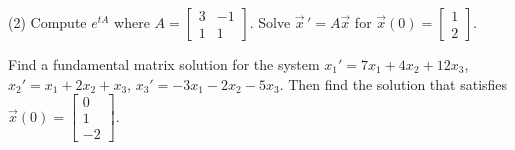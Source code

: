 \documentclass{ximera}
\begin{document}
\begin{exercise}%
    \begin{tasks}(2)
        \task Compute $e^{tA}$ where
        $A=\left[ \begin{smallmatrix}
            3 & -1 \\
            1 & 1 
        \end{smallmatrix}\right]$.
        \task Solve $\vec{x}\,' = A \vec{x}$ for $\vec{x}(0) =
        \left[ \begin{smallmatrix}
            1 \\ 
            2
        \end{smallmatrix}\right]$.
    \end{tasks}
\end{exercise}

\begin{exercise}
    Find a fundamental matrix solution for the system $x_1' = 7x_1+4x_2+ 12x_3$, $x_2' = x_1+2x_2+x_3$, $x_3' = -3x_1-2x_2- 5x_3$.  Then find the solution that satisfies $\vec{x}(0) = 
    \left[ 
        \begin{smallmatrix} 
            0 \\ 
            1 \\ 
            -2 
        \end{smallmatrix} 
    \right]$.
\end{exercise}
\end{document}
